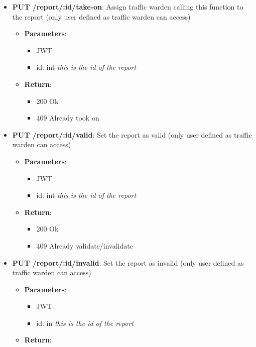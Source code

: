 \documentclass{article}
\begin{document}
\begin{itemize}
\begin{itemize}
\begin{itemize}
				\end{itemize}
			\item \textbf{PUT /report/:id/take-on}:
				Assign traffic warden calling this function to the report (only user defined as traffic warden can access)
				\begin{itemize}
					\item \textbf{Parameters}:
						\begin{itemize}
							\item JWT
							\item id: int \textit{this is the id of the report}
						\end{itemize}
					\item \textbf{Return}:
						\begin{itemize}
							\item 200 Ok
							\item 409 Already took on
						\end{itemize}
				\end{itemize}
			\item \textbf{PUT /report/:id/valid}:
				Set the report as valid (only user defined as traffic warden can access)
				\begin{itemize}
					\item \textbf{Parameters}:
						\begin{itemize}
							\item JWT
							\item id: int \textit{this is the id of the report}
						\end{itemize}
					\item \textbf{Return}:
						\begin{itemize}
							\item 200 Ok
							\item 409 Already validate/invalidate
						\end{itemize}
				\end{itemize}
			\item \textbf{PUT /report/:id/invalid}:
				Set the report as invalid (only user defined as traffic warden can access)
				\begin{itemize}
					\item \textbf{Parameters}:
						\begin{itemize}
							\item JWT
							\item id: in \textit{this is the id of the report}
						\end{itemize}
					\item \textbf{Return}:

\end{itemize}
\end{itemize}
\end{itemize}
\end{document}
